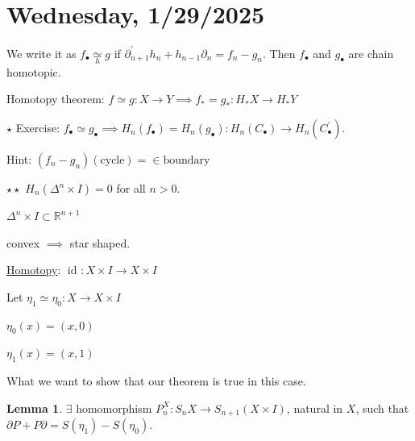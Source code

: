 \documentclass{article}
\theoremstyle{definition}
\newtheorem{lemma}[theorem]{Lemma}
\begin{document}
    \section*{Wednesday, 1/29/2025}
    
    We write it as \(f_\bullet \underset{h}{\simeq} g\) if \(\partial ^{\prime} _{n+1} h_n + h_{n-1} \partial_n = f_n - g_n\). Then \(f_\bullet\) and \(g_\bullet\) are chain homotopic.

    Homotopy theorem: \(f\simeq g: X \to Y \implies f_{\ast} =g_{\ast} : H_{\ast} X \to H_{\ast} Y\)

    \(\star\) Exercise: \(f_\bullet \simeq g_\bullet \implies H_n(f_\bullet) = H_n(g_\bullet): H_n(C_\bullet) \to H_n(C^{\prime}_\bullet)\).

    Hint: \((f_n - g_n)(\text{cycle}) = \in \text{boundary}\)

    \(\star\star\) \(H_n(\Delta^n \times I) = 0\) for all \(n > 0\).
    
    \(\Delta^n \times I \subset \mathbb{R}^{n+1}\)

    convex \(\implies\) star shaped.

    \underline{Homotopy}: \(\operatorname{id}_{}: X \times I \to X \times I\)


    Let \(\eta_1 \simeq \eta_0: X \to X \times I\)

    \(\eta_0(x) = (x,0)\)

    \(\eta_1(x) = (x,1)\)

    What we want to show that our theorem is true in this case.

    \begin{lemma}
        \(\exists\) homomorphism \(P_n^X: S_n X \to S_{n+1} (X \times I)\), natural in \(X\), such that \(\partial P + P \partial = S(\eta_1) - S(\eta_0)\).

    \end{lemma}
    
\end{document}
